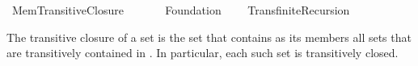 %
\begin{isabellebody}%
%
%
\isadelimdocument
%
\endisadelimdocument
%
\isatagdocument
\isanewline
%
\isamarkuptrue%
%
\endisatagdocument
{\isafolddocument}%
%
\isadelimdocument
%
\endisadelimdocument
%
\isadelimtheory
%
\endisadelimtheory
%
\isatagtheory
{}\isamarkupfalse%
\ Mem{\isacharunderscore}{\kern0pt}Transitive{\isacharunderscore}{\kern0pt}Closure\isanewline
\ \ \isanewline
\ \ \ \ Foundation\isanewline
\ \ \ \ Transfinite{\isacharunderscore}{\kern0pt}Recursion\isanewline
{}%
\endisatagtheory
{\isafoldtheory}%
%
\isadelimtheory
%
\endisadelimtheory
%
\isadelimdocument
%
\endisadelimdocument
%
\isatagdocument
%
\isamarkuptrue%
%
\endisatagdocument
{\isafolddocument}%
%
\isadelimdocument
%
\endisadelimdocument
%
\begin{isamarkuptext}%
The transitive closure of a set  is the set that contains as its members
all sets that are transitively contained in .
In particular, each such set is transitively closed.


\end{isamarkuptext}
\end{isabellebody}
